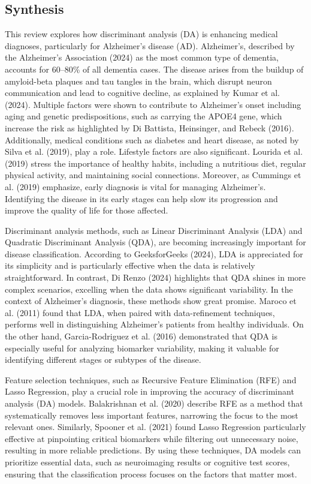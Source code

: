 \documentclass[12pt]{article}
\begin{document}
\subsection{Synthesis}
\noindent

This review explores how discriminant analysis (DA) is enhancing medical diagnoses, particularly for Alzheimer’s disease (AD). Alzheimer’s, described by the Alzheimer’s Association (2024) as the most common type of dementia, accounts for 60–80\% of all dementia cases. The disease arises from the buildup of amyloid-beta plaques and tau tangles in the brain, which disrupt neuron communication and lead to cognitive decline, as explained by Kumar et al. (2024). Multiple factors were shown to contribute to Alzheimer’s onset including aging and genetic predispositions, such as carrying the APOE4 gene, which increase the risk as highlighted by Di Battista, Heinsinger, and Rebeck (2016). Additionally, medical conditions such as diabetes and heart disease, as noted by Silva et al. (2019), play a role. Lifestyle factors are also significant. Lourida et al. (2019) stress the importance of healthy habits, including a nutritious diet, regular physical activity, and maintaining social connections. Moreover, as Cummings et al. (2019) emphasize, early diagnosis is vital for managing Alzheimer’s. Identifying the disease in its early stages can help slow its progression and improve the quality of life for those affected.

Discriminant analysis methods, such as Linear Discriminant Analysis (LDA) and Quadratic Discriminant Analysis (QDA), are becoming increasingly important for disease classification. According to GeeksforGeeks (2024), LDA is appreciated for its simplicity and is particularly effective when the data is relatively straightforward. In contrast, Di Renzo (2024) highlights that QDA shines in more complex scenarios, excelling when the data shows significant variability. In the context of Alzheimer’s diagnosis, these methods show great promise. Maroco et al. (2011) found that LDA, when paired with data-refinement techniques, performs well in distinguishing Alzheimer’s patients from healthy individuals. On the other hand, Garcia-Rodriguez et al. (2016) demonstrated that QDA is especially useful for analyzing biomarker variability, making it valuable for identifying different stages or subtypes of the disease.

Feature selection techniques, such as Recursive Feature Elimination (RFE) and Lasso Regression, play a crucial role in improving the accuracy of discriminant analysis (DA) models. Balakrishnan et al. (2020) describe RFE as a method that systematically removes less important features, narrowing the focus to the most relevant ones. Similarly, Spooner et al. (2021) found Lasso Regression particularly effective at pinpointing critical biomarkers while filtering out unnecessary noise, resulting in more reliable predictions. By using these techniques, DA models can prioritize essential data, such as neuroimaging results or cognitive test scores, ensuring that the classification process focuses on the factors that matter most.
\end{document}
